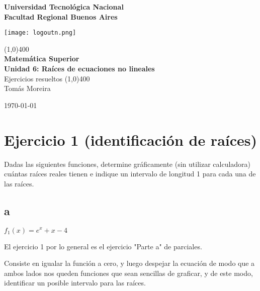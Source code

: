 \documentclass[11pt]{article}
\begin{document}
		
	\begin{titlepage}
		\begin{center}
			\vspace*{0.5cm}
			\Large{\textbf{Universidad Tecnológica Nacional}}\\
			\Large{\textbf{Facultad Regional Buenos Aires}}\\
			\begin{center}
				\texttt{[image: logoutn.png]}
			\end{center}
			\vfill
			\line(1,0){400}\\
			\vspace*{0.3cm}
			\huge{\textbf{Matemática Superior}}\\
			\Large{\textbf{Unidad 6: Raíces de ecuaciones no lineales}}\\
			\large{Ejercicios resueltos}
			\line(1,0){400}\\
			\vfill
			Tomás Moreira \\
			
			
			\today
				
				
		\end{center}
	\end{titlepage}

	\tableofcontents
	\thispagestyle{empty}
	\clearpage

	\setcounter{page}{1}
	
	\section{Ejercicio 1 (identificación de raíces)}
	Dadas las siguientes funciones, determine gráficamente (sin utilizar calculadora) cuántas raíces reales tienen e indique un intervalo de longitud 1 para cada una de las raíces.
	\subsection{a}
	$\displaystyle f_1(x)=e^x+x-4$
	
	El ejercicio 1 por lo general es el ejercicio "Parte a" de parciales.
	
	Consiste en igualar la función a cero, y luego despejar la ecuación de modo que a ambos lados nos queden funciones que sean sencillas de graficar, y de este modo, identificar un posible intervalo para las raíces.
	
\end{document}
